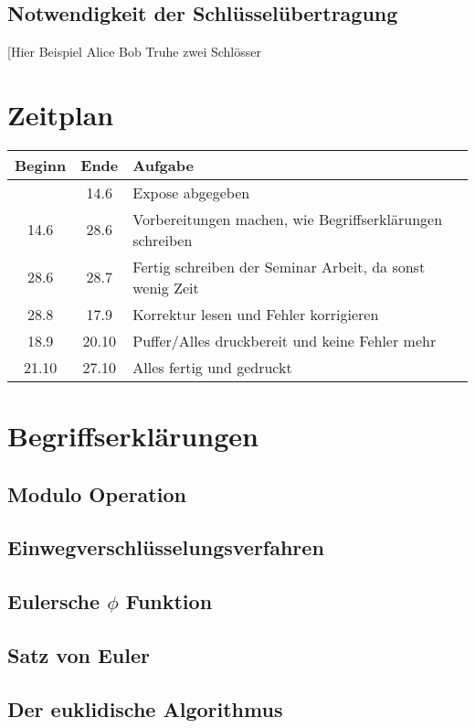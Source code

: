 \documentclass[14pt,a4paper]{scrartcl}
\begin{document}
\subsection{Notwendigkeit der Schlüsselübertragung}
[Hier Beispiel Alice Bob Truhe zwei Schlösser



\section*{Zeitplan}

	\begin{tabular}{ c | c | p{10cm} }
	Beginn & Ende & Aufgabe\\
	 \hline

 & 14.6 & Expose abgegeben \\
14.6 & 28.6 & Vorbereitungen machen, wie Begriffserklärungen schreiben \\
28.6 & 28.7 & Fertig schreiben der Seminar Arbeit, da sonst wenig Zeit \\
28.8 & 17.9 & Korrektur lesen und Fehler korrigieren\\
18.9 & 20.10 & Puffer/Alles druckbereit und keine Fehler mehr\\
21.10 & 27.10 & Alles fertig und gedruckt
	\end{tabular}
	
	

\section{Begriffserklärungen}
	\subsection{Modulo Operation} %
	\subsection{Einwegverschlüsselungsverfahren}
	\label{ch:einweg}
	\subsection{Eulersche $\phi$ Funktion}
	\subsection{Satz von Euler}
	\subsection{Der euklidische Algorithmus}
\end{document}
